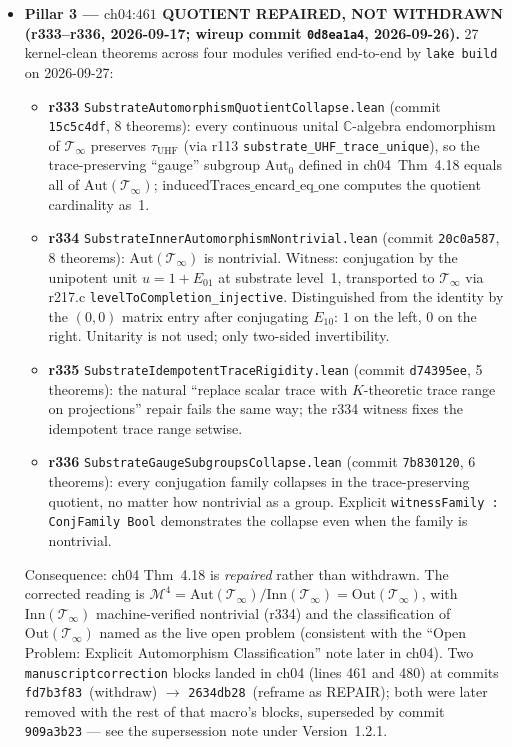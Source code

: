 \begin{itemize}
\item \textbf{Pillar 3 --- $\text{ch04:461}$ QUOTIENT REPAIRED, NOT
WITHDRAWN (r333--r336, 2026-09-17; wireup commit \texttt{0d8ea1a4},
2026-09-26).} 27 kernel-clean theorems across four modules
verified end-to-end by \texttt{lake build} on 2026-09-27:
\begin{itemize}
\item \textbf{r333} \texttt{SubstrateAutomorphismQuotientCollapse.lean}
(commit \texttt{15c5c4df}, 8 theorems): every continuous unital
$\mathbb{C}$-algebra endomorphism of $\mathcal{T}_\infty$ preserves
$\tau_{\text{UHF}}$ (via r113 \texttt{substrate\_UHF\_trace\_unique}),
so the trace-preserving ``gauge'' subgroup $\text{Aut}_0$
defined in ch04~Thm~4.18 equals all of $\text{Aut}(\mathcal{T}_\infty)$;
$\text{inducedTraces\_encard\_eq\_one}$ computes the quotient
cardinality as~1.
\item \textbf{r334} \texttt{SubstrateInnerAutomorphismNontrivial.lean}
(commit \texttt{20c0a587}, 8 theorems): $\text{Aut}(\mathcal{T}_\infty)$
is nontrivial. Witness: conjugation by the unipotent unit
$u = 1 + E_{01}$ at substrate level~1, transported to
$\mathcal{T}_\infty$ via r217.c
\texttt{levelToCompletion\_injective}. Distinguished from the
identity by the $(0,0)$ matrix entry after conjugating $E_{10}$:
$1$ on the left, $0$ on the right. Unitarity is not used; only
two-sided invertibility.
\item \textbf{r335} \texttt{SubstrateIdempotentTraceRigidity.lean}
(commit \texttt{d74395ee}, 5 theorems): the natural
``replace scalar trace with $K$-theoretic trace range on projections''
repair fails the same way; the r334 witness fixes the idempotent
trace range setwise.
\item \textbf{r336} \texttt{SubstrateGaugeSubgroupsCollapse.lean}
(commit \texttt{7b830120}, 6 theorems): every conjugation family
collapses in the trace-preserving quotient, no matter how
nontrivial as a group. Explicit \texttt{witnessFamily : ConjFamily Bool}
demonstrates the collapse even when the family is nontrivial.
\end{itemize}
Consequence: ch04 Thm~4.18 is \emph{repaired} rather than
withdrawn. The corrected reading is
$\mathcal{M}^4 = \text{Aut}(\mathcal{T}_\infty)/\text{Inn}(\mathcal{T}_\infty)
= \text{Out}(\mathcal{T}_\infty)$, with $\text{Inn}(\mathcal{T}_\infty)$
machine-verified nontrivial (r334) and the classification of
$\text{Out}(\mathcal{T}_\infty)$ named as the live open problem
(consistent with the ``Open Problem: Explicit Automorphism
Classification'' note later in ch04). Two \texttt{manuscriptcorrection}
blocks landed in ch04 (lines 461 and 480) at commits
\texttt{fd7b3f83}~(withdraw) $\to$ \texttt{2634db28}~(reframe as REPAIR);
both were later removed with the rest of that macro's blocks, superseded
by commit \texttt{909a3b23} --- see the supersession note under
Version~1.2.1.


\end{itemize}
